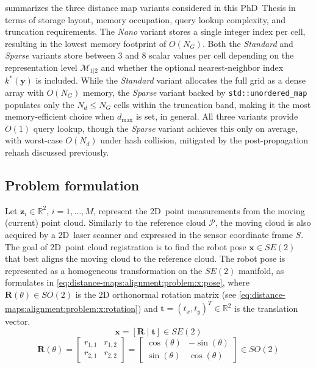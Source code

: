  summarizes
the three distance map variants considered in this PhD~Thesis in
terms of storage layout, memory occupation, query lookup complexity, and
truncation requirements.
The \emph{Nano} variant stores a single integer index per cell, resulting
in the lowest memory footprint of $O(N_G)$.
Both the \emph{Standard} and \emph{Sparse} variants store between $3$
and $8$ scalar values per cell depending on the representation level
$\mathcal{M}_{1|2}$ and whether the optional nearest-neighbor index
$k^*(\mathbf{y})$ is included.
While the \emph{Standard} variant allocates the full grid as a dense
array with $O(N_G)$ memory, the \emph{Sparse} variant backed by
\texttt{std::unordered\_map} populates only the $N_d \leq N_G$ cells
within the truncation band, making it the most memory-efficient choice
when $d_{\max}$ is set, in general.
All three variants provide $O(1)$ query lookup, though the \emph{Sparse}
variant achieves this only on average, with worst-case $O(N_d)$ under
hash collision, mitigated by the post-propagation rehash discussed previously.



\subsection{Problem formulation}
\label{sec:distance-maps:alignment:problem}

Let $\mathbf{z}_i\in\mathbb{R}^2$, $i = 1, \dots, M$, represent
the 2D~point measurements from the moving (current) point cloud.
Similarly to the reference cloud $\mathcal{P}$, the moving cloud is also
acquired by a 2D~laser scanner and expressed in the sensor coordinate frame $S$.
The goal of 2D~point cloud registration is to find the robot pose
$\mathbf{x} \in SE(2)$ that best aligns the moving cloud to the reference cloud.
The robot pose is represented as a homogeneous transformation on the $SE(2)$
manifold, as formulates in \eqref{eq:distance-maps:alignment:problem:x:pose},
where $\mathbf{R}(\theta) \in SO(2)$ is the 2D orthonormal rotation matrix
(see \eqref{eq:distance-maps:alignment:problem:x:rotation}) and
$\mathbf{t} = (t_x, t_y)^T \in \mathbb{R}^2$ is the translation vector.
\begin{equation}
\label{eq:distance-maps:alignment:problem:x:pose}
\mathbf{x} = \left[\mathbf{R} \mid \mathbf{t}\right] \in SE(2)
\end{equation}
\begin{equation}
\label{eq:distance-maps:alignment:problem:x:rotation}
\mathbf{R}(\theta) =
\begin{bmatrix} r_{1,1} & r_{1,2} \\ r_{2,1} & r_{2,2} \end{bmatrix} =
\begin{bmatrix} \cos(\theta) & -\sin(\theta) \\ \sin(\theta) & \cos(\theta) \end{bmatrix} \in SO(2)
\end{equation}

